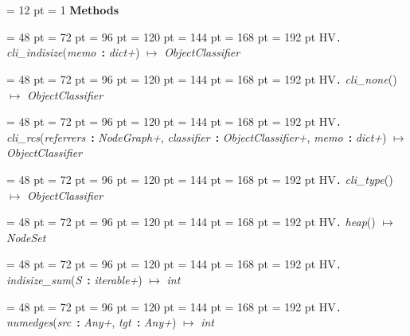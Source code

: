 {{{{{} \noindent
\par}
{\par \pagebreak[3.200000] \noindent \hangindent = 12 pt \hangafter = 1 
{\bf {\large {\bf Methods\/}}\/}\par}
{\par \noindent  \leftskip = 48 pt  \leftmargini = 72 pt  \leftmarginii = 96 pt  \leftmarginiii = 120 pt  \leftmarginiv = 144 pt  \leftmarginv = 168 pt  \leftmarginvi = 192 pt HV{\large {\tt .\/} {\em cli{\_}indisize\/}}({\em memo\/}~{\bf :}  {\em dict+\/}) \(\mapsto \)  {\em ObjectClassifier\/}\par}
{\par \noindent  \leftskip = 48 pt  \leftmargini = 72 pt  \leftmarginii = 96 pt  \leftmarginiii = 120 pt  \leftmarginiv = 144 pt  \leftmarginv = 168 pt  \leftmarginvi = 192 pt HV{\large {\tt .\/} {\em cli{\_}none\/}}() \(\mapsto \)  {\em ObjectClassifier\/}\par}
{\par \noindent  \leftskip = 48 pt  \leftmargini = 72 pt  \leftmarginii = 96 pt  \leftmarginiii = 120 pt  \leftmarginiv = 144 pt  \leftmarginv = 168 pt  \leftmarginvi = 192 pt HV{\large {\tt .\/} {\em cli{\_}rcs\/}}({\em referrers\/}~{\bf :}  {\em NodeGraph+\/}, {\em classifier\/}~{\bf :}  {\em ObjectClassifier+\/}, {\em memo\/}~{\bf :}  {\em dict+\/}) \(\mapsto \)  {\em ObjectClassifier\/}\par}
{\par \noindent  \leftskip = 48 pt  \leftmargini = 72 pt  \leftmarginii = 96 pt  \leftmarginiii = 120 pt  \leftmarginiv = 144 pt  \leftmarginv = 168 pt  \leftmarginvi = 192 pt HV{\large {\tt .\/} {\em cli{\_}type\/}}() \(\mapsto \)  {\em ObjectClassifier\/}\par}
{\par \noindent  \leftskip = 48 pt  \leftmargini = 72 pt  \leftmarginii = 96 pt  \leftmarginiii = 120 pt  \leftmarginiv = 144 pt  \leftmarginv = 168 pt  \leftmarginvi = 192 pt HV{\large {\tt .\/} {\em heap\/}}() \(\mapsto \)  {\em NodeSet\/}\par}
{\par \noindent  \leftskip = 48 pt  \leftmargini = 72 pt  \leftmarginii = 96 pt  \leftmarginiii = 120 pt  \leftmarginiv = 144 pt  \leftmarginv = 168 pt  \leftmarginvi = 192 pt HV{\large {\tt .\/} {\em indisize{\_}sum\/}}({\em S\/}~{\bf :}  {\em iterable+\/}) \(\mapsto \)  {\em int\/}\par}
{\par \noindent  \leftskip = 48 pt  \leftmargini = 72 pt  \leftmarginii = 96 pt  \leftmarginiii = 120 pt  \leftmarginiv = 144 pt  \leftmarginv = 168 pt  \leftmarginvi = 192 pt HV{\large {\tt .\/} {\em numedges\/}}({\em src\/}~{\bf :}  {\em Any+\/}, {\em tgt\/}~{\bf :}  {\em Any+\/}) \(\mapsto \)  {\em int\/}\par}
}}}
